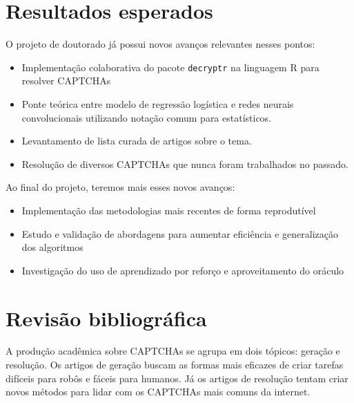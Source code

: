 \documentclass[12pt,]{report}
\providecommand{\tightlist}{%
  \setlength{\itemsep}{0pt}\setlength{\parskip}{0pt}}
\begin{document}
\section{Resultados esperados}\label{resultados-esperados}

O projeto de doutorado já possui novos avanços relevantes nesses pontos:

\begin{itemize}
\tightlist
\item
  Implementação colaborativa do pacote \texttt{decryptr} na linguagem R
  para resolver CAPTCHAs
\item
  Ponte teórica entre modelo de regressão logística e redes neurais
  convolucionais utilizando notação comum para estatísticos.
\item
  Levantamento de lista curada de artigos sobre o tema.
\item
  Resolução de diversos CAPTCHAs que nunca foram trabalhados no passado.
\end{itemize}

Ao final do projeto, teremos mais esses novos avanços:

\begin{itemize}
\tightlist
\item
  Implementação das metodologias mais recentes de forma reprodutível
\item
  Estudo e validação de abordagens para aumentar eficiência e
  generalização dos algoritmos
\item
  Investigação do uso de aprendizado por reforço e aproveitamento do
  oráculo
\end{itemize}

\section{Revisão bibliográfica}\label{revisao-bibliografica}

A produção acadêmica sobre CAPTCHAs se agrupa em dois tópicos: geração e
resolução. Os artigos de geração buscam as formas mais eficazes de criar
tarefas difíceis para robôs e fáceis para humanos. Já os artigos de
resolução tentam criar novos métodos para lidar com os CAPTCHAs mais
comuns da internet.
\end{document}
